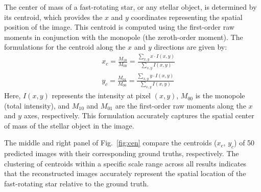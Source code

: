 The center of mass of a fast-rotating star, or any stellar object, is determined by its centroid, which provides the $x$ and $y$ coordinates representing the spatial position of the image. This centroid is computed using the first-order raw moments in conjunction with the monopole (the zeroth-order moment). The formulations for the centroid along the $x$ and $y$ directions are given by:
\begin{eqnarray}
&&x_c = \frac{M_{10}}{M_{00}} = \frac{\sum_{x,y} x \cdot I(x,y)}{\sum_{x,y} I(x,y)} \nonumber \\
&&y_c = \frac{M_{01}}{M_{00}} = \frac{\sum_{x,y} y \cdot I(x,y)}{\sum_{x,y} I(x,y)}
\end{eqnarray}
Here, \(I(x,y)\) represents the intensity at pixel \((x,y)\), \(M_{00}\) is the monopole (total intensity), and \(M_{10}\) and \(M_{01}\) are the first-order raw moments along the $x$ and $y$ axes, respectively. This formulation accurately captures the spatial center of mass of the stellar object in the image.

The middle and right panel of Fig.~\ref{fig:cen} compare the centroids ($x_{c}$, $y_{c}$) of 50 predicted images with their corresponding ground truths, respectively. The clustering of centroids within a specific scale range across all results indicates that the reconstructed images accurately represent the spatial location of the fast-rotating star relative to the ground truth.

